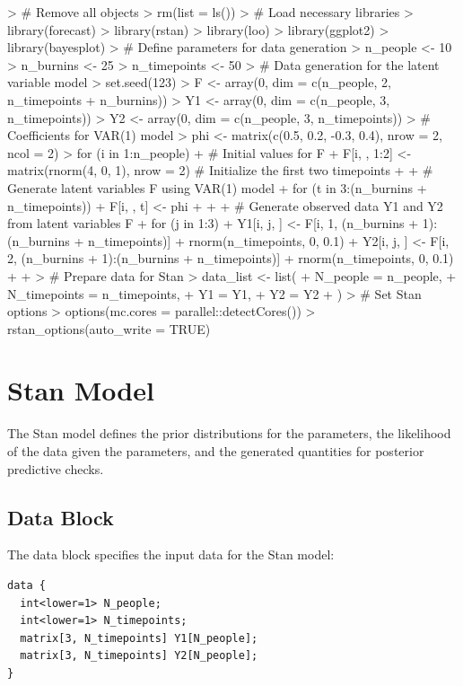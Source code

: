 \documentclass{article}
\begin{document}
\begin{Schunk}
\begin{Sinput}
> # Remove all objects
> rm(list = ls())
> # Load necessary libraries
> library(forecast)
> library(rstan)
> library(loo)
> library(ggplot2)
> library(bayesplot)
> # Define parameters for data generation
> n_people <- 10
> n_burnins <- 25
> n_timepoints <- 50
> # Data generation for the latent variable model
> set.seed(123)
> F <- array(0, dim = c(n_people, 2, n_timepoints + n_burnins))
> Y1 <- array(0, dim = c(n_people, 3, n_timepoints))
> Y2 <- array(0, dim = c(n_people, 3, n_timepoints))
> # Coefficients for VAR(1) model
> phi <- matrix(c(0.5, 0.2, -0.3, 0.4), nrow = 2, ncol = 2)
> for (i in 1:n_people) {
+   # Initial values for F
+   F[i, , 1:2] <- matrix(rnorm(4, 0, 1), nrow = 2) # Initialize the first two timepoints
+   
+   # Generate latent variables F using VAR(1) model
+   for (t in 3:(n_burnins + n_timepoints)) {
+     F[i, , t] <- phi %
+   }
+   
+   # Generate observed data Y1 and Y2 from latent variables F
+   for (j in 1:3) {
+     Y1[i, j, ] <- F[i, 1, (n_burnins + 1):(n_burnins + n_timepoints)] + rnorm(n_timepoints, 0, 0.1)
+     Y2[i, j, ] <- F[i, 2, (n_burnins + 1):(n_burnins + n_timepoints)] + rnorm(n_timepoints, 0, 0.1)
+   }
+ }
> # Prepare data for Stan
> data_list <- list(
+   N_people = n_people,
+   N_timepoints = n_timepoints,
+   Y1 = Y1,
+   Y2 = Y2
+ )
> # Set Stan options
> options(mc.cores = parallel::detectCores())
> rstan_options(auto_write = TRUE)
\end{Sinput}
\end{Schunk}

\section{Stan Model}
The Stan model defines the prior distributions for the parameters, the likelihood of the data given the parameters, and the generated quantities for posterior predictive checks.

\subsection{Data Block}
The data block specifies the input data for the Stan model:
\begin{verbatim}
data {
  int<lower=1> N_people;
  int<lower=1> N_timepoints;
  matrix[3, N_timepoints] Y1[N_people];
  matrix[3, N_timepoints] Y2[N_people];
}
\end{verbatim}
\end{document}

